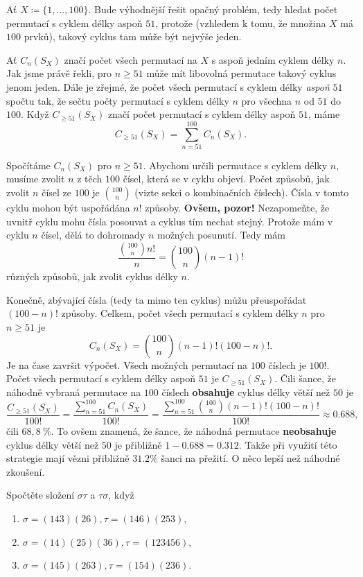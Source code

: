 Ať $X \coloneqq \{1,\ldots,100\}$. Bude výhodnější řešit opačný problém, tedy
hledat počet permutací s cyklem délky aspoň $51$, protože (vzhledem k tomu, že
množina $X$ má $100$ prvků), takový cyklus tam může být nejvýše jeden.

Ať $C_n(S_X)$ značí počet všech permutací na $X$ s aspoň jedním cyklem délky
$n$. Jak jsme právě řekli, pro $n \geq 51$ může mít libovolná permutace takový
cyklus jenom jeden. Dále je zřejmé, že počet všech permutací s cyklem délky
\emph{aspoň} $51$ spočtu tak, že sečtu počty permutací s cyklem délky $n$ pro
všechna $n$ od $51$ do $100$. Když $C_{ \geq 51}(S_X)$ značí počet permutací s
cyklem délky aspoň $51$, máme
\[
 C_{ \geq 51}(S_X) = \sum_{n=51}^{100} C_n(S_X). 
\]

Spočítáme $C_n(S_X)$ pro $n \geq 51$. Abychom určili permutace s cyklem délky
$n$, musíme zvolit $n$ z těch $100$ čísel, která se v cyklu objeví. Počet
způsobů, jak zvolit $n$ čísel ze $100$ je $\binom{100}{n}$ (vizte sekci o
kombinačních číslech). %
Čísla v tomto cyklu mohou být uspořádána $n!$ způsoby. \textbf{Ovšem, pozor!}
Nezapomeňte, že uvnitř cyklu mohu čísla posouvat a cyklus tím nechat stejný.
Protože mám v cyklu $n$ čísel, dělá to dohromady $n$ možných posunutí. Tedy mám
\[
 \frac{\binom{100}{n}n!}{n} = \binom{100}{n}(n-1)!
\]
různých způsobů, jak zvolit cyklus délky $n$.

Konečně, zbývající čísla (tedy ta mimo ten cyklus) můžu přeuspořádat $(100-n)!$
způsoby. Celkem, počet všech permutací s cyklem délky $n$ pro $n \geq 51$ je
\[
 C_n(S_X) = \binom{100}{n}(n-1)!(100-n)!.
\]
Je na čase završit výpočet. Všech možných permutací na $100$ číslech je $100!$.
Počet všech permutací s cyklem délky aspoň $51$ je $C_{\geq 51}(S_X)$. Čili šance,
že náhodně vybraná permutace na $100$ číslech \textbf{obsahuje} cyklus délky
větší než $50$ je
\[
 \frac{C_{ \geq 51}(S_X)}{100!} = \frac{\sum_{n=51}^{100} C_n(S_X)}{100!} =
 \frac{\sum_{n=51}^{100} \binom{100}{n}(n-1)!(100-n)!}{100!} \approx 0.688,
\]
čili $68,8~\%$. To ovšem znamená, že šance, že náhodná permutace
\textbf{neobsahuje} cyklus délky větší než $50$ je přibližně $1 - 0.688 =
0.312$. Takže při využití této strategie mají vězni přibližně $31.2\%$ šanci na
přežití. O něco lepší než náhodné zkoušení.

\begin{exercise}
 Spočtěte složení $\sigma\tau$ a $\tau\sigma$, když
 \begin{enumerate}[topsep=0pt,label=(\arabic*)]
  \item $\sigma = (143)(26), \tau = (146)(253)$,
  \item $\sigma = (14)(25)(36), \tau = (123456)$,
  \item $\sigma = (145)(263), \tau = (154)(236)$.
 \end{enumerate}
\end{exercise}


